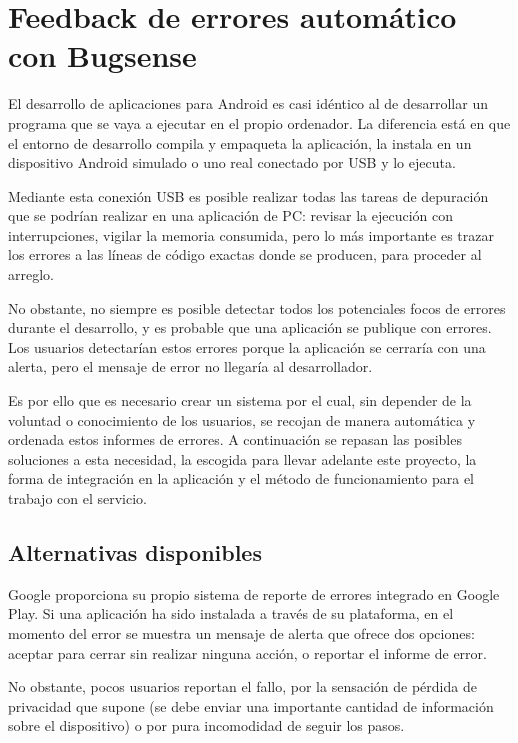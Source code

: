 \documentclass[main]{subfiles}
\begin{document}
\section[Bugsense]{Feedback de errores automático con Bugsense}

El desarrollo de aplicaciones para Android es casi idéntico al de desarrollar un programa que se vaya a ejecutar en el propio ordenador. La diferencia está en que el entorno de desarrollo compila y empaqueta la aplicación, la instala en un dispositivo Android simulado o uno real conectado por USB y lo ejecuta.

Mediante esta conexión USB es posible realizar todas las tareas de depuración que se podrían realizar en una aplicación de PC: revisar la ejecución con interrupciones, vigilar la memoria consumida, pero lo más importante es trazar los errores a las líneas de código exactas donde se producen, para proceder al arreglo.

No obstante, no siempre es posible detectar todos los potenciales focos de errores durante el desarrollo, y es probable que una aplicación se publique con errores. Los usuarios detectarían estos errores porque la aplicación se cerraría con una alerta, pero el mensaje de error no llegaría al desarrollador.

Es por ello que es necesario crear un sistema por el cual, sin depender de la voluntad o conocimiento de los usuarios, se recojan de manera automática y ordenada estos informes de errores. A continuación se repasan las posibles soluciones a esta necesidad, la escogida para llevar adelante este proyecto, la forma de integración en la aplicación y el método de funcionamiento para el trabajo con el servicio.

\subsection{Alternativas disponibles}

Google proporciona su propio sistema de reporte de errores integrado en Google Play. Si una aplicación ha sido instalada a través de su plataforma, en el momento del error se muestra un mensaje de alerta que ofrece dos opciones: aceptar para cerrar sin realizar ninguna acción, o reportar el informe de error.

No obstante, pocos usuarios reportan el fallo, por la sensación de pérdida de privacidad que supone (se debe enviar una importante cantidad de información sobre el dispositivo) o por pura incomodidad de seguir los pasos.
\end{document}
